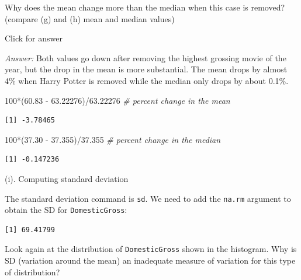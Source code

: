 \documentclass[
]{book}
\newenvironment{Shaded}{\begin{snugshade}}{\end{snugshade}}
\newcommand{\AttributeTok}[1]{\textcolor[rgb]{0.77,0.63,0.00}{#1}}
\newcommand{\CommentTok}[1]{\textcolor[rgb]{0.56,0.35,0.01}{\textit{#1}}}
\newcommand{\ConstantTok}[1]{\textcolor[rgb]{0.00,0.00,0.00}{#1}}
\newcommand{\DecValTok}[1]{\textcolor[rgb]{0.00,0.00,0.81}{#1}}
\newcommand{\FloatTok}[1]{\textcolor[rgb]{0.00,0.00,0.81}{#1}}
\newcommand{\FunctionTok}[1]{\textcolor[rgb]{0.00,0.00,0.00}{#1}}
\newcommand{\NormalTok}[1]{#1}
\newcommand{\SpecialCharTok}[1]{\textcolor[rgb]{0.00,0.00,0.00}{#1}}
\begin{document}
Why does the mean change more than the median when this case is removed? (compare (g) and (h) mean and median values)

Click for answer

\emph{Answer:} Both values go down after removing the highest grossing movie of the year, but the drop in the mean is more substantial. The mean drops by almost 4\% when Harry Potter is removed while the median only drops by about 0.1\%.

\begin{Shaded}
\begin{Highlighting}[]
\DecValTok{100}\SpecialCharTok{*}\NormalTok{(}\FloatTok{60.83} \SpecialCharTok{{-}} \FloatTok{63.22276}\NormalTok{)}\SpecialCharTok{/}\FloatTok{63.22276} \CommentTok{\# percent change in the mean}
\end{Highlighting}
\end{Shaded}

\begin{verbatim}
[1] -3.78465
\end{verbatim}

\begin{Shaded}
\begin{Highlighting}[]
\DecValTok{100}\SpecialCharTok{*}\NormalTok{(}\FloatTok{37.30} \SpecialCharTok{{-}} \FloatTok{37.355}\NormalTok{)}\SpecialCharTok{/}\FloatTok{37.355} \CommentTok{\# percent change in the median}
\end{Highlighting}
\end{Shaded}

\begin{verbatim}
[1] -0.147236
\end{verbatim}

(i). Computing standard deviation

The standard deviation command is \texttt{sd}. We need to add the \texttt{na.rm} argument to obtain the SD for \texttt{DomesticGross}:

\begin{Shaded}
\end{Shaded}

\begin{verbatim}
[1] 69.41799
\end{verbatim}

Look again at the distribution of \texttt{DomesticGross} shown in the histogram. Why is SD (variation around the mean) an inadequate measure of variation for this type of distribution?
\end{document}
